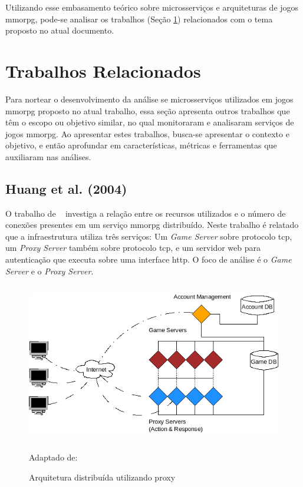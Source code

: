 Utilizando esse embasamento teórico sobre microsserviços e arquiteturas de jogos \ac{mmorpg}, pode-se analisar os trabalhos (Seção \ref{sec:similares}) relacionados com o tema proposto no atual documento.



\section{Trabalhos Relacionados}
\label{sec:similares}



Para nortear o desenvolvimento da análise se microsserviços utilizados em jogos \ac{mmorpg} proposto no atual trabalho, essa seção apresenta outros trabalhos que têm o escopo ou objetivo similar, no qual monitoraram e analisaram serviços de jogos \ac{mmorpg}.
%
Ao apresentar estes trabalhos, busca-se apresentar o contexto e objetivo, e então aprofundar em características, métricas e ferramentas que auxiliaram nas análises.
%



\subsection{Huang et al. (2004)}
\label{sec:huang}


O trabalho de ~\cite{1417630} investiga a relação entre os recursos utilizados e o número de conexões presentes em um serviço \ac{mmorpg} distribuído.
%
Neste trabalho é relatado que a infraestrutura utiliza três serviços: Um \textit{Game Server} sobre protocolo \ac{tcp}, um \textit{Proxy Server} também sobre protocolo \ac{tcp}, e um servidor web para autenticação que executa sobre uma interface \ac{http}.
%
O foco de análise é o \textit{Game Server} e o \textit{Proxy Server}.



\begin{figure}[htb!]
\caption{Arquitetura distribuída utilizando proxy}
\label{fig:game_with_proxy}
\includegraphics[height=7cm]{img/cap2/game_with_proxy.png}
\centering

Adaptado de:~\cite{1417630}
\end{figure}



